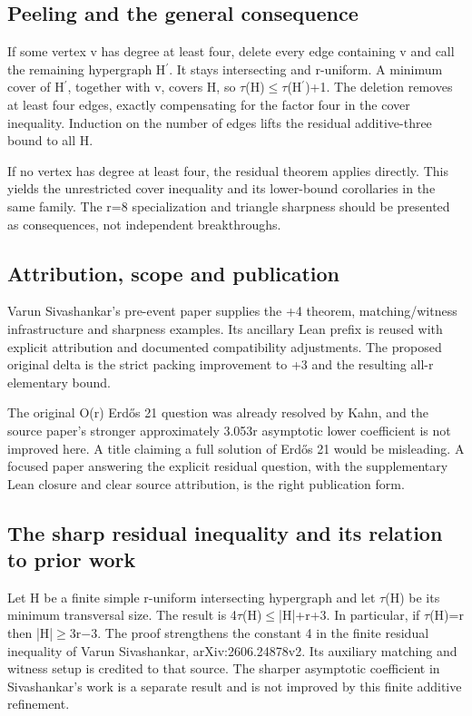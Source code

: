 \documentclass[11pt,a4paper]{article}
\begin{document}
\subsection{Peeling and the general consequence}
If some vertex v has degree at least four, delete every edge containing v and call the remaining hypergraph H\ensuremath{^{\prime}}. It stays intersecting and r-uniform. A minimum cover of H\ensuremath{^{\prime}}, together with v, covers H, so \ensuremath{\tau}(H)\ensuremath{\leq}\ensuremath{\tau}(H\ensuremath{^{\prime}})+1. The deletion removes at least four edges, exactly compensating for the factor four in the cover inequality. Induction on the number of edges lifts the residual additive-three bound to all H.

If no vertex has degree at least four, the residual theorem applies directly. This yields the unrestricted cover inequality and its lower-bound corollaries in the same family. The r=8 specialization and triangle sharpness should be presented as consequences, not independent breakthroughs.

\subsection{Attribution, scope and publication}
Varun Sivashankar's pre-event paper supplies the +4 theorem, matching/witness infrastructure and sharpness examples. Its ancillary Lean prefix is reused with explicit attribution and documented compatibility adjustments. The proposed original delta is the strict packing improvement to +3 and the resulting all-r elementary bound.

The original O(r) Erdős 21 question was already resolved by Kahn, and the source paper's stronger approximately 3.053r asymptotic lower coefficient is not improved here. A title claiming a full solution of Erdős 21 would be misleading. A focused paper answering the explicit residual question, with the supplementary Lean closure and clear source attribution, is the right publication form.

\subsection{The sharp residual inequality and its relation to prior work}
Let H be a finite simple r-uniform intersecting hypergraph and let \ensuremath{\tau}(H) be its minimum transversal size. The result is 4\ensuremath{\tau}(H)\ensuremath{\leq}|H|+r+3. In particular, if \ensuremath{\tau}(H)=r then |H|\ensuremath{\geq}3r\ensuremath{-}3. The proof strengthens the constant 4 in the finite residual inequality of Varun Sivashankar, arXiv:2606.24878v2. Its auxiliary matching and witness setup is credited to that source. The sharper asymptotic coefficient in Sivashankar's work is a separate result and is not improved by this finite additive refinement.
\end{document}
